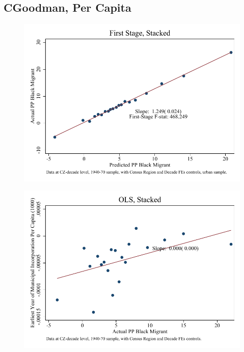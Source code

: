 \documentclass{article}
\begin{document}
\subsection{CGoodman, Per Capita}

\clearpage
\begin{figure}
\centering
\includegraphics{figures/simplefigs/stacked_cgoodman_pc_C3_urban_fs.pdf}
\end{figure}
\clearpage
\begin{figure}
\centering
\includegraphics{figures/simplefigs/stacked_cgoodman_pc_C3_urban_ols.pdf}
\end{figure}
\clearpage
\end{document}
